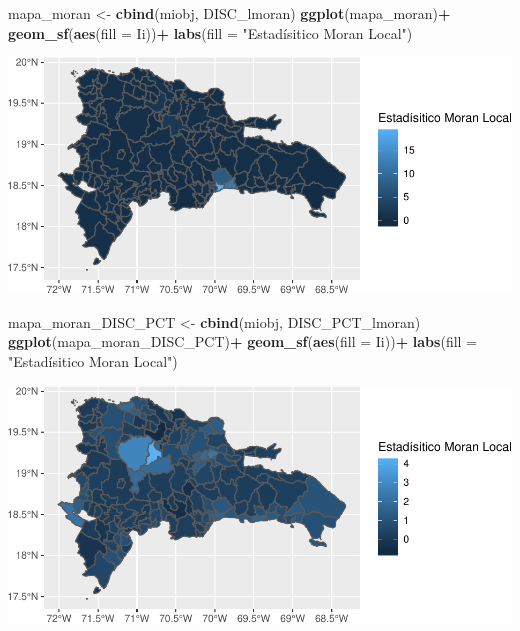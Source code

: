 \documentclass[11pt,]{article}
\newenvironment{Shaded}{\begin{snugshade}}{\end{snugshade}}
\newcommand{\KeywordTok}[1]{\textcolor[rgb]{0.13,0.29,0.53}{\textbf{#1}}}
\newcommand{\DataTypeTok}[1]{\textcolor[rgb]{0.13,0.29,0.53}{#1}}
\newcommand{\StringTok}[1]{\textcolor[rgb]{0.31,0.60,0.02}{#1}}
\newcommand{\OperatorTok}[1]{\textcolor[rgb]{0.81,0.36,0.00}{\textbf{#1}}}
\newcommand{\NormalTok}[1]{#1}
\begin{document}
\begin{Shaded}
\begin{Highlighting}[]
\NormalTok{mapa_moran <-}\StringTok{ }\KeywordTok{cbind}\NormalTok{(miobj, DISC_lmoran)}
\KeywordTok{ggplot}\NormalTok{(mapa_moran)}\OperatorTok{+}
\StringTok{  }\KeywordTok{geom_sf}\NormalTok{(}\KeywordTok{aes}\NormalTok{(}\DataTypeTok{fill =}\NormalTok{ Ii))}\OperatorTok{+}
\StringTok{  }\KeywordTok{labs}\NormalTok{(}\DataTypeTok{fill =} \StringTok{"Estadísitico Moran Local"}\NormalTok{)}
\end{Highlighting}
\end{Shaded}

\includegraphics{proyecto_files/figure-latex/unnamed-chunk-25-1.pdf}

\begin{Shaded}
\begin{Highlighting}[]
\NormalTok{mapa_moran_DISC_PCT <-}\StringTok{ }\KeywordTok{cbind}\NormalTok{(miobj, DISC_PCT_lmoran)}
\KeywordTok{ggplot}\NormalTok{(mapa_moran_DISC_PCT)}\OperatorTok{+}
\StringTok{  }\KeywordTok{geom_sf}\NormalTok{(}\KeywordTok{aes}\NormalTok{(}\DataTypeTok{fill =}\NormalTok{ Ii))}\OperatorTok{+}
\StringTok{  }\KeywordTok{labs}\NormalTok{(}\DataTypeTok{fill =} \StringTok{"Estadísitico Moran Local"}\NormalTok{)}
\end{Highlighting}
\end{Shaded}

\includegraphics{proyecto_files/figure-latex/unnamed-chunk-25-2.pdf}
\end{document}
